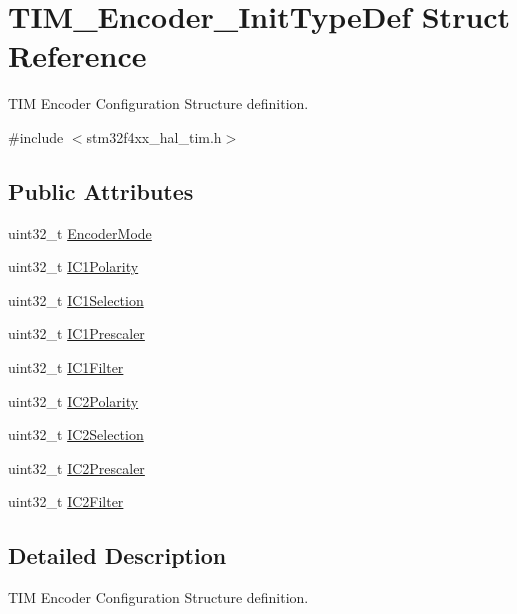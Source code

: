 \hypertarget{struct_t_i_m___encoder___init_type_def}{}\section{T\+I\+M\+\_\+\+Encoder\+\_\+\+Init\+Type\+Def Struct Reference}
\label{struct_t_i_m___encoder___init_type_def}


T\+IM Encoder Configuration Structure definition.  




{\ttfamily \#include $<$stm32f4xx\+\_\+hal\+\_\+tim.\+h$>$}

\subsection*{Public Attributes}
\begin{DoxyCompactItemize}
\item 
uint32\+\_\+t \hyperlink{struct_t_i_m___encoder___init_type_def_ab1e4b0752d88c04081e3ff2fea6aa52e}{Encoder\+Mode}
\item 
uint32\+\_\+t \hyperlink{struct_t_i_m___encoder___init_type_def_a3e27323d593e4f3b95ebaa3772e79618}{I\+C1\+Polarity}
\item 
uint32\+\_\+t \hyperlink{struct_t_i_m___encoder___init_type_def_a85fbdebacff594ff1ad0d16eddfdc179}{I\+C1\+Selection}
\item 
uint32\+\_\+t \hyperlink{struct_t_i_m___encoder___init_type_def_a56307eb4766e3f0e1cd1cd3c4fc2157e}{I\+C1\+Prescaler}
\item 
uint32\+\_\+t \hyperlink{struct_t_i_m___encoder___init_type_def_a50f3051c1b568b9dcde146199f97f3fb}{I\+C1\+Filter}
\item 
uint32\+\_\+t \hyperlink{struct_t_i_m___encoder___init_type_def_abb7968a8ba34e13da1fb8f5916a754ce}{I\+C2\+Polarity}
\item 
uint32\+\_\+t \hyperlink{struct_t_i_m___encoder___init_type_def_a84a39a8667f296b4b3fbe1a0add58396}{I\+C2\+Selection}
\item 
uint32\+\_\+t \hyperlink{struct_t_i_m___encoder___init_type_def_ac80972d0e157508ff075815da58070cb}{I\+C2\+Prescaler}
\item 
uint32\+\_\+t \hyperlink{struct_t_i_m___encoder___init_type_def_a30cdb580735007aa9735b2f5cc133049}{I\+C2\+Filter}
\end{DoxyCompactItemize}


\subsection{Detailed Description}
T\+IM Encoder Configuration Structure definition. 


